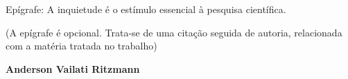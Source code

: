 Epígrafe: A inquietude é o estímulo essencial à pesquisa científica.

(A epígrafe  é opcional. Trata-se de uma citação seguida de autoria, relacionada com a matéria tratada no trabalho)

\bigskip
\textbf{Anderson Vailati Ritzmann }